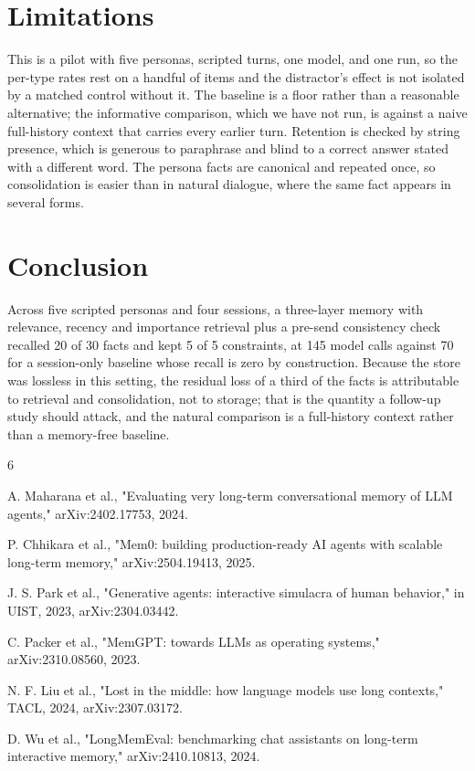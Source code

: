 \documentclass[runningheads,a4paper]{llncs}
\begin{document}
\section{Limitations}

This is a pilot with five personas, scripted turns, one model, and one run, so the per-type rates rest on a handful of items and the distractor's effect is not isolated by a matched control without it. The baseline is a floor rather than a reasonable alternative; the informative comparison, which we have not run, is against a naive full-history context that carries every earlier turn. Retention is checked by string presence, which is generous to paraphrase and blind to a correct answer stated with a different word. The persona facts are canonical and repeated once, so consolidation is easier than in natural dialogue, where the same fact appears in several forms.

\section{Conclusion}

Across five scripted personas and four sessions, a three-layer memory with relevance, recency and importance retrieval plus a pre-send consistency check recalled 20 of 30 facts and kept 5 of 5 constraints, at 145 model calls against 70 for a session-only baseline whose recall is zero by construction. Because the store was lossless in this setting, the residual loss of a third of the facts is attributable to retrieval and consolidation, not to storage; that is the quantity a follow-up study should attack, and the natural comparison is a full-history context rather than a memory-free baseline.

\begin{thebibliography}{6}

\small

\setlength{\itemsep}{0pt}

\setlength{\parskip}{0pt}

 A. Maharana et al., "Evaluating very long-term conversational memory of LLM agents," arXiv:2402.17753, 2024.

 P. Chhikara et al., "Mem0: building production-ready AI agents with scalable long-term memory," arXiv:2504.19413, 2025.

 J. S. Park et al., "Generative agents: interactive simulacra of human behavior," in UIST, 2023, arXiv:2304.03442.

 C. Packer et al., "MemGPT: towards LLMs as operating systems," arXiv:2310.08560, 2023.

 N. F. Liu et al., "Lost in the middle: how language models use long contexts," TACL, 2024, arXiv:2307.03172.

 D. Wu et al., "LongMemEval: benchmarking chat assistants on long-term interactive memory," arXiv:2410.10813, 2024.

\end{thebibliography}
\end{document}
